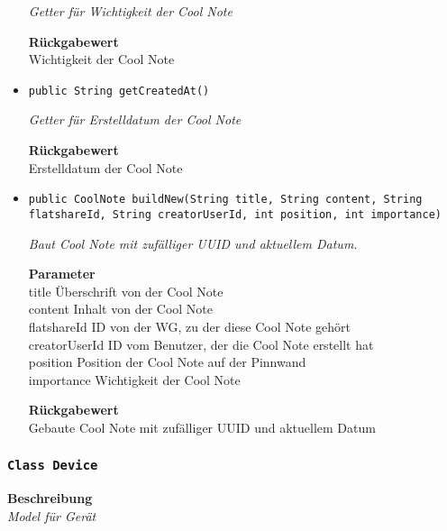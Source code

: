 \begin{itemize}
    	\textit{Getter für Wichtigkeit der Cool Note}
    	
    	
    	
    	\textbf{Rückgabewert} \\
    	Wichtigkeit der Cool Note        \item{\texttt{public String getCreatedAt()}}
    	
    	\textit{Getter für Erstelldatum der Cool Note}
    	
    	
    	
    	\textbf{Rückgabewert} \\
    	Erstelldatum der Cool Note        \item{\texttt{public CoolNote buildNew(String title, String content, String flatshareId, String creatorUserId, int position, int importance)}}
    	
    	\textit{Baut Cool Note mit zufälliger UUID und aktuellem Datum.}
    	
    	\textbf{Parameter} \\
    	title Überschrift von der Cool Note\\
    	content Inhalt von der Cool Note\\
    	flatshareId ID von der WG, zu der diese Cool Note gehört\\
    	creatorUserId ID vom Benutzer, der die Cool Note erstellt hat\\
    	position Position der Cool Note auf der Pinnwand\\
    	importance Wichtigkeit der Cool Note
    	
    	\textbf{Rückgabewert} \\
    	Gebaute Cool Note mit zufälliger UUID und aktuellem Datum
    \end{itemize}
    \subsubsection{\texttt{Class Device}}
    \textbf{Beschreibung} \\
    \textit{Model für Gerät}
